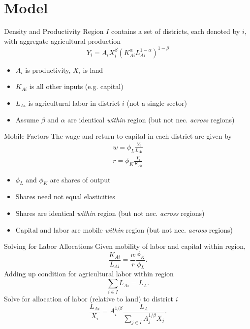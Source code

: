 \documentclass[10pt, xcolor=dvipsnames]{beamer}
\begin{document}
\section{Model}

\begin{frame}{Density and Productivity}
Region $I$ contains a set of districts, each denoted by $i$, with aggregate agricultural production
\begin{equation}
Y_{i} = A_{i} X_{i}^{\beta} \left(K_{Ai}^{\alpha}L_{Ai}^{1-\alpha}\right)^{1-\beta} \label{EQ_production}
\end{equation}
\begin{itemize}
  \item $A_i$ is productivity, $X_i$ is land
  \item $K_{Ai}$ is all other inputs (e.g. capital)
  \item $L_{Ai}$ is agricultural labor in district $i$ (not a single sector)
  \item Assume $\beta$ and $\alpha$ are identical \textit{within} region (but not nec. \textit{across} regions)
\end{itemize}
\end{frame}

\begin{frame}{Mobile Factors}
The wage and return to capital in each district are given by 
\begin{eqnarray}
    w = \phi_L \frac{Y_i}{L_{Ai}} \\ \nonumber
    r = \phi_K \frac{Y_i}{K_{Ai}} \label{EQ_factorprices}
\end{eqnarray}
\begin{itemize}
  \item $\phi_L$ and $\phi_K$ are shares of output 
  \item Shares need not equal elasticities
  \item Shares are identical \textit{within} region (but not nec. \textit{across} regions)
  \item Capital and labor are mobile \textit{within} region (but not nec. \textit{across} regions)
\end{itemize}
\end{frame}

\begin{frame}{Solving for Labor Allocations}
Given mobility of labor and capital within region,
\begin{equation}
    \frac{K_{Ai}}{L_{Ai}} = \frac{w}{r}\frac{\phi_K}{\phi_L}.
\end{equation}
Adding up condition for agricultural labor within region
\begin{equation}
\sum_{i\in I} L_{Ai} = L_A.
\end{equation}
Solve for allocation of labor (relative to land) to district $i$
\begin{equation}
\frac{L_{Ai}}{X_i} = A_{i}^{1/\beta}\frac{L_A}{\sum_{j\in I} A_{j}^{1/\beta}X_{j}}. \label{EQ_LaX}
\end{equation}
\end{frame}
\end{document}
